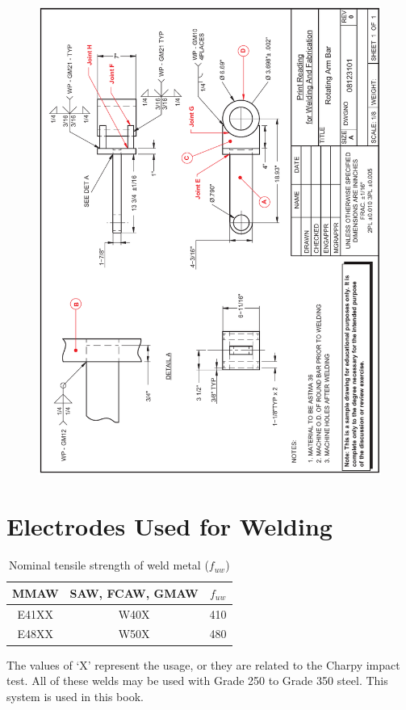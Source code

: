 \begin{figure}[p]
\centering
\includegraphics[width=.99\textwidth]{PIC/CH07/EXAMPLE/EX}
\end{figure}
\section{Electrodes Used for Welding}
\begin{table}[H]
\centering\footnotesize
\caption{Nominal tensile strength of weld metal ($f_{uw}$)}
\begin{tabular}{ccc}
	\toprule
	MMAW  & SAW, FCAW, GMAW &    $f_{uw}$    \\ \midrule
	E41XX &      W40X       & \SI{410}{\mpa} \\
	E48XX &      W50X       & \SI{480}{\mpa} \\ \bottomrule
\end{tabular}
\end{table}
The values of `X' represent the usage, or they are related to the Charpy impact test. All of these welds may be used with Grade 250 to Grade 350 steel. This system is used in this book.

